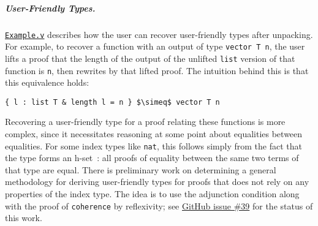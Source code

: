 \subparagraph*{User-Friendly Types.}
\href{http://github.com/uwplse/ornamental-search/blob/itp+equiv/plugin/coq/examples/Example.v}{\lstinline{Example.v}} describes how the user can recover user-friendly types
after unpacking. For example, to recover a function with an output of type \lstinline{vector T n},
the user lifts a proof that the length of the output of the unlifted \lstinline{list} version of that function is \lstinline{n}, then rewrites by that 
lifted proof. The intuition behind this is that this equivalence holds:
\begin{lstlisting}
{ l : list T & length l = n } $\simeq$ vector T n
\end{lstlisting}
Recovering a user-friendly type for a proof relating these functions is more complex, since
it necessitates reasoning at some point about equalities between equalities. For some index types like \lstinline{nat}, this follows simply
from the fact that the type forms an h-set~\cite{univalent2013homotopy}:
all proofs of equality between the same two terms of that type are equal.
There is preliminary work on determining a general methodology for deriving user-friendly types for proofs
that does not rely on any properties of the index type. The idea is to use the adjunction condition
along with the proof of \lstinline{coherence} by reflexivity; see \href{http://github.com/uwplse/ornamental-search/issues/39}{GitHub issue \#39} for the status of this work.

